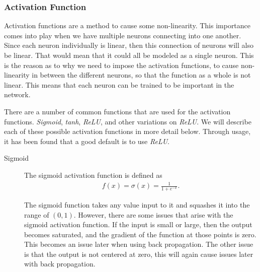 \documentclass[10pt]{amsart}
\newenvironment{Figure}
{\par\medskip\noindent\minipage{\linewidth}}
{\endminipage\par\medskip}
\begin{document}
\begin{multicols}{2}
  \subsubsection{Activation Function}%
  \label{ssub:activation_function}

  Activation functions are a method to cause some non-linearity. This
  importance comes into play when we have multiple neurons connecting into one
  another. Since each neuron individually is linear, then this connection of
  neurons will also be linear. That would mean that it could all be modeled as a
  single neuron. This is the reason as to why we need to impose the activation
  functions, to cause non-linearity in between the different neurons, so that
  the function as a whole is not linear. This means that each neuron can be
  trained to be important in the network.

  There are a number of common functions that are used for the activation
  functions. \textit{Sigmoid}, \textit{tanh}, \textit{ReLU}, and other
  variations on \textit{ReLU}. We will describe each of these possible
  activation functions in more detail below. Through usage, it has been found
  that a good default is to use \textit{ReLU}.

  \begin{description}
    \item[Sigmoid] The sigmoid activation function is defined as
      \begin{align*}
        f(x)=\sigma(x)=\frac{1}{1+e^{-x}}.
      \end{align*}
      \begin{Figure}
      \begin{center}
      \end{center}
      \label{fig:sigmoid}
      \end{Figure}
      The sigmoid function takes any value input to it and squashes it into the
      range of $(0,1)$. However, there are some issues that arise with the
      sigmoid activation function. If the input is small or large, then the
      output becomes saturated, and the gradient of the function at those
      points is zero. This becomes an issue later when using back propagation.
      The other issue is that the output is not centered at zero, this will
      again cause issues later with back propagation.


\end{description}
\end{multicols}
\end{document}
